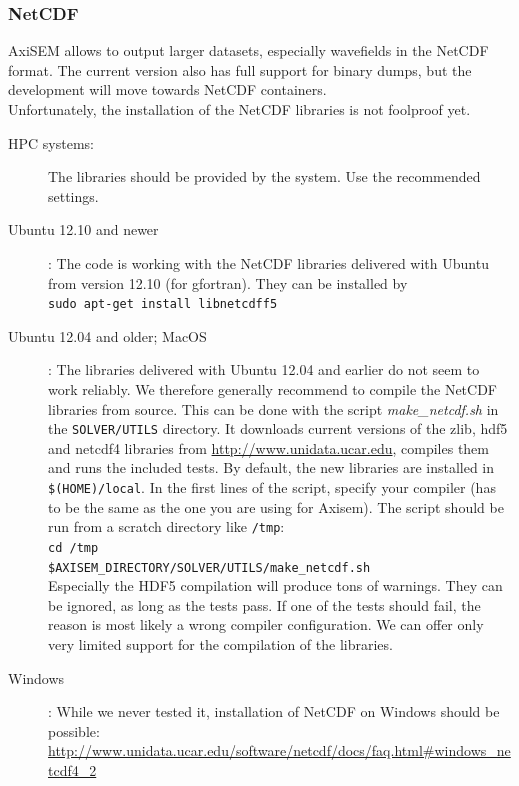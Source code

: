 \documentclass[11pt,letter,fleqn,english,notitlepage]{article}
\begin{document}


 
\subsubsection{NetCDF}
AxiSEM allows to output larger datasets, especially wavefields in the NetCDF format. The current version also has full support for binary dumps, but the development will move towards NetCDF containers.\\
Unfortunately, the installation of the NetCDF libraries is not foolproof yet.
\begin{description}
 \item[HPC systems:] The libraries should be provided by the system. Use the recommended settings.
 \item[Ubuntu 12.10 and newer]: The code is working with the NetCDF libraries delivered with Ubuntu from version 12.10 (for gfortran). They can be installed by \\
 \verb|sudo apt-get install libnetcdff5|
 \item[Ubuntu 12.04 and older; MacOS]: The libraries delivered with Ubuntu 12.04 and earlier do not seem to work reliably. We therefore generally recommend to compile the NetCDF libraries from source. This can be done with the script \textit{make\_netcdf.sh} in the \verb|SOLVER/UTILS| directory. It downloads current versions of the zlib, hdf5 and netcdf4 libraries from \url{http://www.unidata.ucar.edu}, compiles them and runs the included tests. By default, the new libraries are installed in \verb|$(HOME)/local|. In the first lines of the script, specify your compiler (has to be the same as the one you are using for Axisem). The script should be run from a scratch directory like \verb|/tmp|:\\
 \verb|cd /tmp|\\
 \verb|$AXISEM_DIRECTORY/SOLVER/UTILS/make_netcdf.sh|\\
 Especially the HDF5 compilation will produce tons of warnings. They can be ignored, as long as the tests pass. If one of the tests should fail, the reason is most likely a wrong compiler configuration. We can offer only very limited support for the compilation of the libraries. 
 \item[Windows]: While we never tested it, installation of NetCDF on Windows should be possible:
 \url{http://www.unidata.ucar.edu/software/netcdf/docs/faq.html#windows_netcdf4_2}
\end{description}
\end{document}
